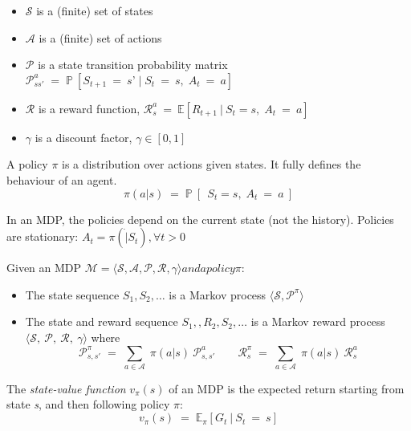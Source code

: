 \documentclass[10pt]{article}
\begin{document}
\begin{itemize}
\item $\mathcal{S}$ is a (finite) set of states
\item $\mathcal{A}$ is a (finite) set of actions
\item $\mathcal{P}$ is a state transition probability matrix \newline
$\mathcal{P}_{ss'}^{a} \; = \; \mathbb{P}\:[S_{t+1}\:=\:\textit{s'}\; | \; S_{t}\:=\:\textit{s}, \; A_{t}\:=\:\textit{a}]$
\item $\mathcal{R}$ is a reward function, $\mathcal{R}_{s}^{a}  \: = \: \mathbb{E}[R_{t+1} \: | \: S_{t} = s, \; A_{t}\:=\:\textit{a}]$
\item $\gamma$ is a discount factor, $\gamma \in [0,1]$
\end{itemize}

A policy $\pi$ is a distribution over actions given states. It fully defines the behaviour of an agent.
\begin{equation}
\pi(a|s) \; = \; \mathbb{P}\:[\:\: S_{t} = s, \; A_{t}\:=\:\textit{a}\:]
\end{equation}

In an MDP, the policies depend on the current state (not the history). Policies are stationary: $A_{t} = \pi ( \dot | S_{t} ), \forall t > 0$ \newline

Given an MDP $\mathcal{M} = \langle \mathcal{S, A, P, R,} \gamma \rangle and a policy \pi$:
\begin{itemize}
\item The state sequence $S_{1}, S_{2}, \ldots$ is a Markov process $\langle \mathcal{S, P^{\pi}} \rangle$
\item The state and reward sequence $S_{1}, ,R_{2}, S_{2}, \ldots$ is a Markov reward process $\langle \mathcal{S}, \: \mathcal{P}, \: \mathcal{R}, \: \gamma \rangle$ where
\begin{equation}
\mathcal{P}_{s,s'}^{\pi} \; = \; \sum_{a \in \mathcal{A}} \; \pi (a|s)\: \mathcal{P}_{s,s'}^{a} \qquad
\mathcal{R}_{s}^{\pi} \; = \; \sum_{a \in \mathcal{A}} \; \pi (a|s)\: \mathcal{R}_{s}^{a} 
\end{equation}
\end{itemize}

The \textit{state-value function} $v_{\pi}(s)$ of an MDP is the expected return starting from state \textit{s}, and then following policy $\pi$:
\begin{equation}
v_{\pi}(s) \; = \; \mathbb{E}_{\pi} [ G_{t} \: | \: S_{t} \: = \: s] 
\end{equation}
\end{document}
